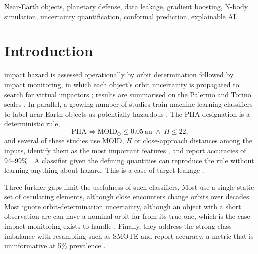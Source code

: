 \documentclass[journal]{IEEEtran}
\begin{document}
\begin{IEEEkeywords}
Near-Earth objects, planetary defense, data leakage, gradient boosting, N-body simulation, uncertainty quantification, conformal prediction, explainable AI.
\end{IEEEkeywords}

\section{Introduction}
 impact hazard is assessed operationally by orbit determination followed by impact monitoring, in which each object's orbit uncertainty is propagated to search for virtual impactors \cite{milani2005,roa2021}; results are summarised on the Palermo and Torino scales \cite{chesley2002,binzel2000}. In parallel, a growing number of studies train machine-learning classifiers to label near-Earth objects as potentially hazardous \cite{malakouti2023,bora2024,jacques2025,delina2024}. The PHA designation is a deterministic rule,
\begin{equation}
\mathrm{PHA} \iff \mathrm{MOID}_{\oplus} \le 0.05~\mathrm{au} \;\wedge\; H \le 22,
\label{eq:pha}
\end{equation}
and several of these studies use MOID, $H$ or close-approach distances among the inputs, identify them as the most important features \cite{bora2024}, and report accuracies of 94--99\% \cite{malakouti2023,jacques2025}. A classifier given the defining quantities can reproduce the rule without learning anything about hazard. This is a case of target leakage \cite{kaufman2012}.

Three further gaps limit the usefulness of such classifiers. Most use a single static set of osculating elements, although close encounters change orbits over decades. Most ignore orbit-determination uncertainty, although an object with a short observation arc can have a nominal orbit far from its true one, which is the case impact monitoring exists to handle \cite{milani2005}. Finally, they address the strong class imbalance with resampling such as SMOTE \cite{chawla2002} and report accuracy, a metric that is uninformative at 5\% prevalence \cite{saito2015}.
\end{document}
